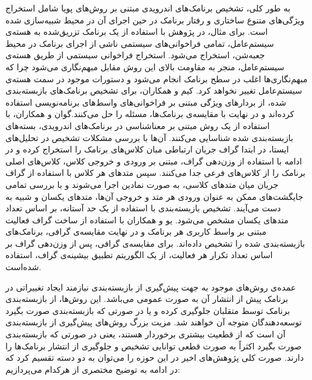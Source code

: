 به طور کلی، تشخیص برنامک‌های اندرویدی مبتنی بر روش‌های پویا شامل استخراج ویژگی‌های متنوع ساختاری و رفتار برنامک در حین اجرای آن در محیط‌ شبیه‌سازی شده ‌است. برای مثال، در پژوهش  با استفاده از یک برنامک تزریق‌شده به هسته‌ی سیستم‌عامل، تمامی فراخوانی‌های سیستمی ناشی از اجرای برنامک در محیط جعبه‌شن، استخراج می‌شود. استخراج فراخوانی سیستمی از طریق هسته‌ی سیستم‌عامل، منجر به مقاومت بالای این روش مقابل مبهم‌نگاری می‌شود چرا که مبهم‌نگاری‌ها اغلب در سطح برنامک انجام می‌شود و دستورات موجود در سمت هسته‌ی سیستم‌عامل تغییر نخواهد کرد. کیم‌ و همکاران، برای تشخیص برنامک‌های بازبسته‌بندی شده، از بردار‌های ویژگی مبتنی بر فراخوانی‌های واسط‌های برنامه‌نویسی استفاده کرده‌اند و در نهایت با مقایسه‌ی برنامک‌ها، مسئله‌ را حل می‌کنند.گوان و همکاران، با استفاده از یک روش مبتنی بر معناشناسی در برنامک‌های اندرویدی، بسته‌های بازبسته‌بندی شده شناسایی می‌کنند. آن‌ها با بررسی مشکلات تشخیص در تحلیل‌های ایستا، در ابتدا گراف جریان ارتباطی مبان کلاس‌های برنامک‌ را استخراج کرده و در ادامه با استفاده از وزن‌دهی گراف، مبتنی بر ورودی و خروجی کلاس، کلاس‌های اصلی برنامک را از کلاس‌های فرعی  جدا می‌کنند. سپس متد‌های هر کلاس با استفاده از گراف جریان میان متد‌های کلاسی، به صورت نمادین اجرا می‌شوند و با بررسی تمامی جایگشت‌های ممکن به عنوان ورودی هر متد و خروجی آن‌ها، متد‌های یکسان و شبیه به دست می‌آیند. تشخیص بازبسته‌بندی با استفاده از یک حد آستانه، بر اساس تعداد متد‌های یکسان مشخص می‌شود. یو و همکاران با استفاده از ساخت گراف فعالیت مبتنی بر واسط کاربری هر برنامک و در نهایت مقایسه‌ی گرافی، برنامک‌های بازبسته‌بندی شده را تشخیص داده‌اند. برای مقایسه‌ی گرافی، پس از وزن‌دهی گراف بر اساس تعداد تکرار هر فعالیت، از یک الگوریتم تطبیق بیشینه‌ی گراف، استفاده شده‌است.

عمده‌ی روش‌های موجود به جهت پیش‌گیری از بازبسته‌بندی نیازمند ایجاد تغییراتی در برنامک پیش از انتشار آن به صورت عمومی می‌باشد. این روش‌ها، از بازبسته‌بندی برنامک توسط متقلبان جلوگیری کرده و یا در صورتی که بازبسته‌بندی صورت بگیرد توسعه‌دهندگان متوجه آن خواهند‌ شد. مزیت بزرگ روش‌های پیش‌گیری از بازبسته‌بندی آن‌ است که از قطعیت بیشتری برخوردار هستند، یعنی در صورتی که بازبسته‌بندی صورت بگیرد اکثراً به صورت قطعی توانایی تشخیص و جلوگیری از انتشار برنامک‌ها را دارند.  صورت کلی پژوهش‌های اخیر در این حوزه را می‌توان به دو دسته تقسیم کرد که در ادامه به توضیح مختصری از هر‌کدام می‌پردازیم:


	
